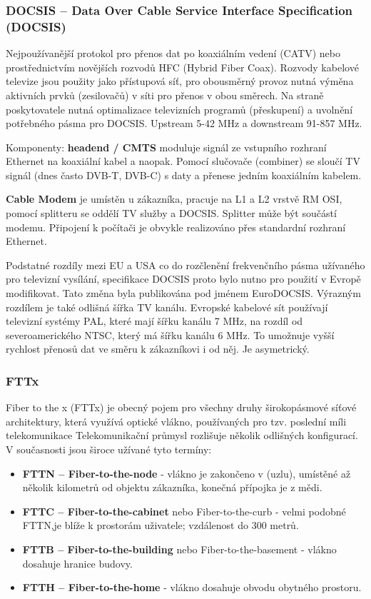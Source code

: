 \subsubsection{DOCSIS -- Data Over Cable Service Interface Specification (DOCSIS)}
Nejpoužívanější protokol pro přenos dat po koaxiálním vedení (CATV) nebo prostřednictvím novějších rozvodů HFC (Hybrid Fiber Coax). Rozvody kabelové televize jsou použity jako přístupová síť, pro obousměrný provoz nutná výměna aktivních prvků (zesilovačů) v síti pro přenos v obou směrech. Na straně poskytovatele nutná optimalizace televizních programů (přeskupení) a uvolnění potřebného pásma pro DOCSIS. Upstream 5-42 MHz a downstream 91-857 MHz.

Komponenty: \textbf{headend / CMTS} moduluje signál ze vstupního rozhraní Ethernet na koaxiální kabel a naopak. Pomocí slučovače (combiner) se sloučí TV signál (dnes často DVB-T, DVB-C) s daty a přenese jedním koaxiálním kabelem.


\textbf{Cable Modem} je umístěn u zákazníka, pracuje na L1 a L2 vrstvě RM OSI, pomocí splitteru se oddělí TV služby a DOCSIS. Splitter může být součástí modemu. Připojení k počítači je obvykle realizováno přes standardní rozhraní Ethernet.

Podstatné rozdíly mezi EU a USA co do rozčlenění frekvenčního pásma užívaného pro televizní vysílání, specifikace DOCSIS proto bylo nutno pro použití v Evropě modifikovat. Tato změna byla publikována pod jménem EuroDOCSIS. Výrazným rozdílem je také odlišná šířka TV kanálu. Evropské kabelové sít používají televizní systémy PAL, které mají šířku kanálu 7 MHz, na rozdíl od severoamerického NTSC, který má šířku kanálu 6 MHz. To umožnuje vyšší rychlost přenosů dat ve směru k zákazníkovi i od něj. Je asymetrický.

\subsubsection{FTTx}
Fiber to the x (FTTx) je obecný pojem pro všechny druhy širokopásmové síťové architektury, která využívá optické vlákno, používaných pro tzv. poslední míli telekomunikace 
Telekomunikační průmysl rozlišuje několik odlišných konfigurací. V současnosti jsou široce užívané tyto termíny:
\begin{itemize}
\item \textbf{FTTN -- Fiber-to-the-node} - vlákno je zakončeno v (uzlu), umístěné až několik kilometrů od objektu zákazníka, konečná přípojka je z mědi.
\item \textbf{FTTC -- Fiber-to-the-cabinet} nebo Fiber-to-the-curb - velmi podobné FTTN,je blíže k prostorám uživatele; vzdálenost do 300 metrů.
\item \textbf{FTTB -- Fiber-to-the-building} nebo Fiber-to-the-basement - vlákno dosahuje hranice budovy.
\item \textbf{FTTH -- Fiber-to-the-home} - vlákno dosahuje obvodu obytného prostoru.


\end{itemize}

